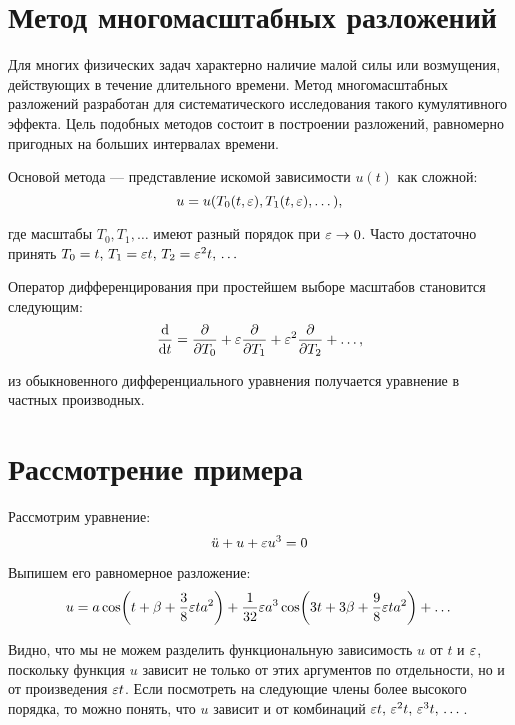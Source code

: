 \chapter*{Метод многомасштабных разложений}

Для многих физических задач характерно
наличие малой силы или возмущения,
действующих в течение длительного времени.
Метод многомасштабных разложений разработан
для систематического исследования
такого кумулятивного эффекта.
Цель подобных методов состоит
в построении разложений,
равномерно пригодных на больших интервалах времени.
\cite{coul1972}

Основой метода --- представление
искомой зависимости $u(t)$ как сложной:
\begin{equation*}
    u = u(T_0(t, \varepsilon), T_1(t, \varepsilon), \dots),
\end{equation*}

где масштабы $T_0, T_1, \dots$
имеют разный порядок при $\varepsilon \to 0$.
Часто достаточно принять
$T_0 = t, \, T_1 = \varepsilon t, \, T_2 = \varepsilon^2 t, \, \dots$

Оператор дифференцирования при простейшем выборе масштабов
становится следующим:
\begin{equation*}
    \dv{}{t} = \pdv{}{T_0} + \varepsilon \pdv{}{T_1} +
    \varepsilon^2 \pdv{}{T_2} + \dots,
\end{equation*}

из обыкновенного дифференциального уравнения
получается уравнение в частных производных.

\chapter*{Рассмотрение примера}

Рассмотрим уравнение:
\begin{equation} \label{Eq:example}
    \ddot{u} + u + \varepsilon u^3 = 0
\end{equation}

Выпишем его равномерное разложение:
\begin{equation*}
    u = a \cos(t + \beta + \frac{3}{8} \varepsilon t a^2) +
    \frac{1}{32} \varepsilon a^3
    \cos(3 t + 3 \beta + \frac{9}{8} \varepsilon t a^2) + \dots
\end{equation*}

Видно, что мы не можем разделить
функциональную зависимость $u$ от $t$ и $\varepsilon$,
поскольку функция $u$ зависит не только от этих аргументов
по отдельности, но и от произведения $\varepsilon t$.
Если посмотреть на следующие члены более высокого порядка,
то можно понять, что $u$ зависит и от комбинаций
$\varepsilon t, \, \varepsilon^2 t, \, \varepsilon^3 t, \, \dots$.

